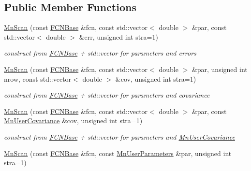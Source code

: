 \subsection*{Public Member Functions}
\begin{DoxyCompactItemize}
\item 
\mbox{\hyperlink{classROOT_1_1Minuit2_1_1MnScan_a377822c78ab78d995bc0a710dbc0c426}{Mn\+Scan}} (const \mbox{\hyperlink{classROOT_1_1Minuit2_1_1FCNBase}{F\+C\+N\+Base}} \&fcn, const std\+::vector$<$ double $>$ \&par, const std\+::vector$<$ double $>$ \&err, unsigned int stra=1)
\begin{DoxyCompactList}\small\item\em construct from \mbox{\hyperlink{classROOT_1_1Minuit2_1_1FCNBase}{F\+C\+N\+Base}} + std\+::vector for parameters and errors \end{DoxyCompactList}\item 
\mbox{\hyperlink{classROOT_1_1Minuit2_1_1MnScan_a293bc22ed5bd5755f4c1d7256c1936ab}{Mn\+Scan}} (const \mbox{\hyperlink{classROOT_1_1Minuit2_1_1FCNBase}{F\+C\+N\+Base}} \&fcn, const std\+::vector$<$ double $>$ \&par, unsigned int nrow, const std\+::vector$<$ double $>$ \&cov, unsigned int stra=1)
\begin{DoxyCompactList}\small\item\em construct from \mbox{\hyperlink{classROOT_1_1Minuit2_1_1FCNBase}{F\+C\+N\+Base}} + std\+::vector for parameters and covariance \end{DoxyCompactList}\item 
\mbox{\hyperlink{classROOT_1_1Minuit2_1_1MnScan_a289c4259abdbd4886dddf51d30531870}{Mn\+Scan}} (const \mbox{\hyperlink{classROOT_1_1Minuit2_1_1FCNBase}{F\+C\+N\+Base}} \&fcn, const std\+::vector$<$ double $>$ \&par, const \mbox{\hyperlink{classROOT_1_1Minuit2_1_1MnUserCovariance}{Mn\+User\+Covariance}} \&cov, unsigned int stra=1)
\begin{DoxyCompactList}\small\item\em construct from \mbox{\hyperlink{classROOT_1_1Minuit2_1_1FCNBase}{F\+C\+N\+Base}} + std\+::vector for parameters and \mbox{\hyperlink{classROOT_1_1Minuit2_1_1MnUserCovariance}{Mn\+User\+Covariance}} \end{DoxyCompactList}\item 
\mbox{\hyperlink{classROOT_1_1Minuit2_1_1MnScan_a93a7093c7881feddd2f7e4541eb8fad9}{Mn\+Scan}} (const \mbox{\hyperlink{classROOT_1_1Minuit2_1_1FCNBase}{F\+C\+N\+Base}} \&fcn, const \mbox{\hyperlink{classROOT_1_1Minuit2_1_1MnUserParameters}{Mn\+User\+Parameters}} \&par, unsigned int stra=1)

\end{DoxyCompactItemize}
